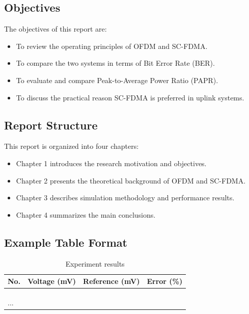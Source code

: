 \subsection{Objectives}

The objectives of this report are:

\begin{itemize}
    \item To review the operating principles of OFDM and SC-FDMA.
    \item To compare the two systems in terms of Bit Error Rate (BER).
    \item To evaluate and compare Peak-to-Average Power Ratio (PAPR).
    \item To discuss the practical reason SC-FDMA is preferred in uplink systems.
\end{itemize}

\subsection{Report Structure}

This report is organized into four chapters:

\begin{itemize}
    \item Chapter 1 introduces the research motivation and objectives.
    \item Chapter 2 presents the theoretical background of OFDM and SC-FDMA.
    \item Chapter 3 describes simulation methodology and performance results.
    \item Chapter 4 summarizes the main conclusions.
\end{itemize}

\subsection{Example Table Format}

\begin{table}[H]
    \centering
    \caption{Experiment results}
    \begin{tabularx}{0.85\textwidth}{
        | >{\centering}y
        | >{\centering\arraybackslash}a
        | >{\centering\arraybackslash}a
        | >{\centering\arraybackslash}y|
    }
    \hline
    \bfseries No.
    & \bfseries Voltage (mV)
    & \bfseries Reference (mV)
    & \bfseries Error (\%) \\
     &   &   &   \\  &   &   &   \\  &   &   &   \\ \hline
    ... &   &   &   \\ \hline
    \end{tabularx}
    \label{tab:example1}
\end{table}

